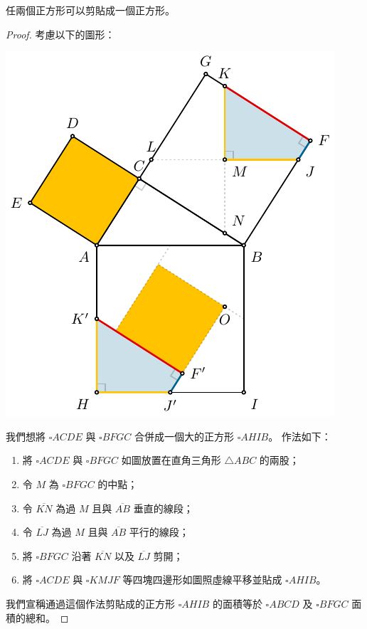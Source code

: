\documentclass{article}
\begin{document}
\begin{multicols}{2}
\begin{theorem}\label{thm:pythagorean}
	任兩個正方形可以剪貼成一個正方形。
\end{theorem}
\begin{proof}
	考慮以下的圖形：
	\begin{center}
		\includegraphics[scale=1]{figures/figure-pythagorean.pdf}
	\end{center}
	我們想將 $\square{ACDE}$ 與 $\square{BFGC}$ 合併成一個大的正方形 $\square{AHIB}$。
	作法如下：
	\begin{enumerate}
		\item 將 $\square{ACDE}$ 與 $\square{BFGC}$ 如圖放置在直角三角形 $\triangle{ABC}$ 的兩股；
		\item 令 $M$ 為 $\square{BFGC}$ 的中點；
		\item 令 $\overline{KN}$ 為過 $M$ 且與 $\overline{AB}$ 垂直的線段；
		\item 令 $\overline{LJ}$ 為過 $M$ 且與 $\overline{AB}$ 平行的線段；
		\item 將 $\square{BFGC}$ 沿著 $\overline{KN}$ 以及 $\overline{LJ}$ 剪開；
		\item 將 $\square{ACDE}$ 與 $\square{KMJF}$ 等四塊四邊形如圖照虛線平移並貼成 $\square{AHIB}$。
	\end{enumerate}
	我們宣稱通過這個作法剪貼成的正方形 $\square{AHIB}$ 的面積等於 $\square{ABCD}$ 及 $\square{BFGC}$ 面積的總和。


\end{proof}
\end{multicols}
\end{document}
